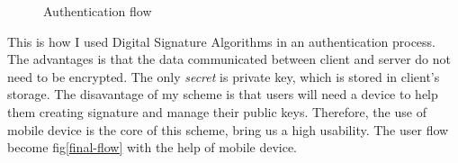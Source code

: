 \begin{CJK}{Bg5}{bsmi}
\begin{figure}
\centering
{}
\caption{Authentication flow}
\end{figure}

This is how I used Digital Signature Algorithms in an authentication process. The advantages is that the data communicated between client and server do not need to be encrypted. The only \emph{secret} is private key, which is stored in client's storage. The disavantage of my scheme is that users will need a device to help them creating signature and manage their public keys. Therefore, the use of mobile device is the core of this scheme, bring us a high usability. The user flow become fig\ref{final-flow} with the help of mobile device.


\end{CJK}

